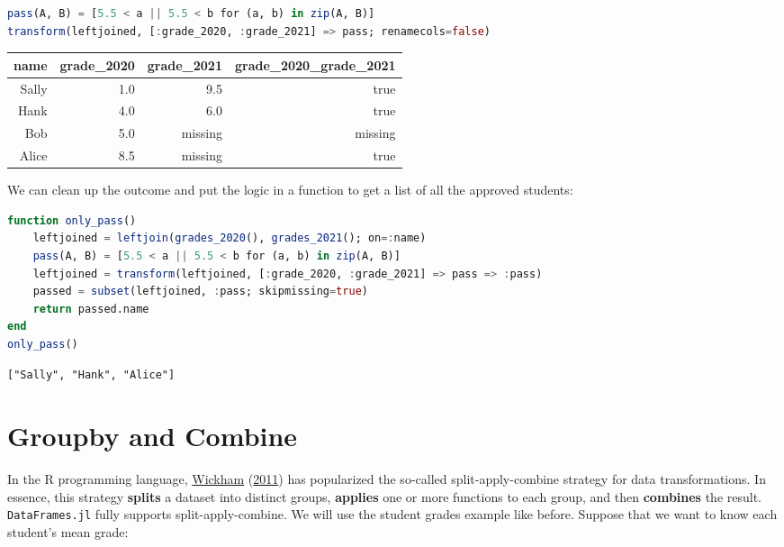 \documentclass[
  notoc %
]{tufte-book}
\newcommand{\passthrough}[1]{#1}
\begin{document}
\begin{lstlisting}[language=Julia]
pass(A, B) = [5.5 < a || 5.5 < b for (a, b) in zip(A, B)]
transform(leftjoined, [:grade_2020, :grade_2021] => pass; renamecols=false)
\end{lstlisting}

\begin{longtable}[]{@{}rrrr@{}}
\toprule
name & grade\_2020 & grade\_2021 & grade\_2020\_grade\_2021 \\
\midrule
\endhead
Sally & 1.0 & 9.5 & true \\
Hank & 4.0 & 6.0 & true \\
Bob & 5.0 & missing & missing \\
Alice & 8.5 & missing & true \\
\bottomrule
\end{longtable}

We can clean up the outcome and put the logic in a function to get a
list of all the approved students:

\begin{lstlisting}[language=Julia]
function only_pass()
    leftjoined = leftjoin(grades_2020(), grades_2021(); on=:name)
    pass(A, B) = [5.5 < a || 5.5 < b for (a, b) in zip(A, B)]
    leftjoined = transform(leftjoined, [:grade_2020, :grade_2021] => pass => :pass)
    passed = subset(leftjoined, :pass; skipmissing=true)
    return passed.name
end
only_pass()
\end{lstlisting}

\begin{lstlisting}[language=Output]
["Sally", "Hank", "Alice"]
\end{lstlisting}

\hypertarget{sec:groupby_combine}{%
\section{Groupby and Combine}\label{sec:groupby_combine}}

In the R programming language,
\protect\hyperlink{ref-wickham2011split}{Wickham}
(\protect\hyperlink{ref-wickham2011split}{2011}) has popularized the
so-called split-apply-combine strategy for data transformations. In
essence, this strategy \textbf{splits} a dataset into distinct groups,
\textbf{applies} one or more functions to each group, and then
\textbf{combines} the result. \passthrough{\lstinline!DataFrames.jl!}
fully supports split-apply-combine. We will use the student grades
example like before. Suppose that we want to know each student's mean
grade:
\end{document}
